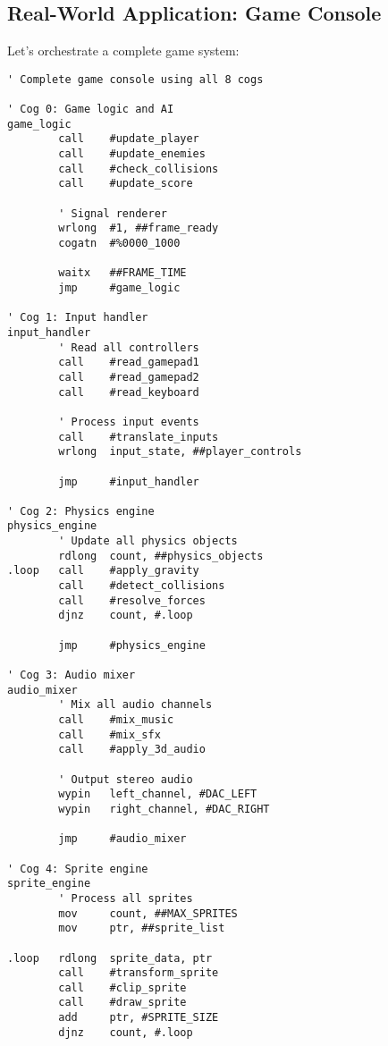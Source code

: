 \documentclass[11pt]{book}
\begin{document}
\hypertarget{real-world-application-game-console}{%
\subsection{Real-World Application: Game
Console}\label{real-world-application-game-console}}

Let's orchestrate a complete game system:

\begin{lstlisting}
' Complete game console using all 8 cogs

' Cog 0: Game logic and AI
game_logic
        call    #update_player
        call    #update_enemies
        call    #check_collisions
        call    #update_score
        
        ' Signal renderer
        wrlong  #1, ##frame_ready
        cogatn  #%0000_1000
        
        waitx   ##FRAME_TIME
        jmp     #game_logic

' Cog 1: Input handler
input_handler
        ' Read all controllers
        call    #read_gamepad1
        call    #read_gamepad2
        call    #read_keyboard
        
        ' Process input events
        call    #translate_inputs
        wrlong  input_state, ##player_controls
        
        jmp     #input_handler

' Cog 2: Physics engine
physics_engine
        ' Update all physics objects
        rdlong  count, ##physics_objects
.loop   call    #apply_gravity
        call    #detect_collisions
        call    #resolve_forces
        djnz    count, #.loop
        
        jmp     #physics_engine

' Cog 3: Audio mixer
audio_mixer
        ' Mix all audio channels
        call    #mix_music
        call    #mix_sfx
        call    #apply_3d_audio
        
        ' Output stereo audio
        wypin   left_channel, #DAC_LEFT
        wypin   right_channel, #DAC_RIGHT
        
        jmp     #audio_mixer

' Cog 4: Sprite engine
sprite_engine
        ' Process all sprites
        mov     count, ##MAX_SPRITES
        mov     ptr, ##sprite_list
        
.loop   rdlong  sprite_data, ptr
        call    #transform_sprite
        call    #clip_sprite
        call    #draw_sprite
        add     ptr, #SPRITE_SIZE
        djnz    count, #.loop
        

\end{lstlisting}
\end{document}
